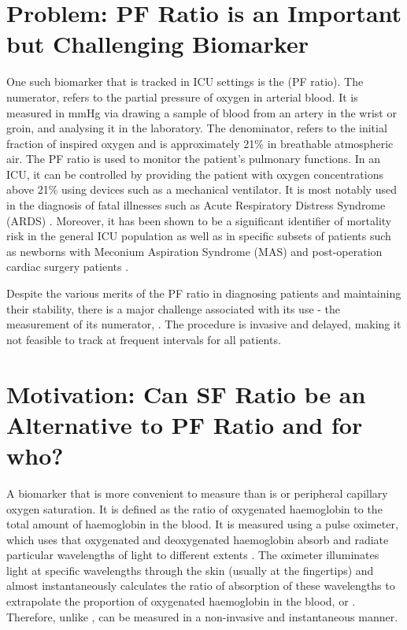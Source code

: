\section{Problem: PF Ratio is an Important but Challenging Biomarker}

One such biomarker that is tracked in ICU settings is the  \PF(PF ratio). The numerator, \Pa refers to the partial pressure of oxygen in arterial blood. It is measured in mmHg via drawing a sample of blood from an artery in the wrist or groin, and analysing it in the laboratory. The denominator, \Fi refers to the initial fraction of inspired oxygen and is approximately 21\% in breathable atmospheric air. The PF ratio is used to monitor the patient's pulmonary functions. In an ICU, it can be controlled by providing the patient with oxygen concentrations above 21\% using devices such as a mechanical ventilator. It is most notably used in the diagnosis of fatal illnesses such as Acute Respiratory Distress Syndrome (ARDS) \citep{bernard1994american}. Moreover, it has been shown to be a significant identifier of mortality risk in the general ICU population \citep{villar2011risk} as well as in specific subsets of patients such as newborns with Meconium Aspiration Syndrome (MAS)  \citep{narayanan2019pao2} and post-operation cardiac surgery patients \citep{esteve2014evaluation}.

Despite the various merits of the PF ratio in diagnosing patients and maintaining their stability, there is a major challenge associated with its use - the measurement of its numerator, \Pa. The  procedure is invasive and delayed, making it not feasible to track at frequent intervals for all patients. 


\section{Motivation: Can SF Ratio be an Alternative to PF Ratio and for who?}
A biomarker that is more convenient to measure than \Pa is \Sp or peripheral capillary oxygen saturation. It is defined as the ratio of oxygenated haemoglobin to the total amount of haemoglobin in the blood. It is measured using a pulse oximeter, which uses that oxygenated and deoxygenated haemoglobin absorb and radiate particular wavelengths of light to different extents \citep{jubran1999pulse} . The oximeter illuminates light at specific wavelengths through the skin (usually at the fingertips) and almost instantaneously calculates the ratio of absorption of these wavelengths to extrapolate the proportion of oxygenated haemoglobin in the blood, or \Sp \citep{jubran2015}. Therefore, unlike \Pa, \Sp can be measured in a non-invasive and instantaneous manner. 

